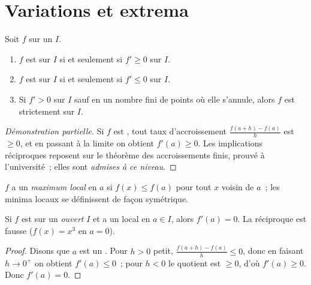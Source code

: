 \section{Variations et extrema}

\begin{theorem}\label{thm:g12:deriv:variations}
Soit $f$  sur un  $I$.
\begin{enumerate}
  \item $f$ est  sur $I$ si et seulement si $f' \geq 0$ sur $I$.
  \item $f$ est  sur $I$ si et seulement si $f' \leq 0$ sur $I$.
  \item Si $f' > 0$ sur $I$ sauf en un nombre fini de points où elle
        s'annule, alors $f$ est strictement  sur $I$.
\end{enumerate}
\end{theorem}

\begin{proof}[Démonstration partielle]
Si $f$ est , tout taux d'accroissement
$\frac{f(a+h)-f(a)}{h}$ est $\geq 0$, et en passant à la limite on obtient
$f'(a) \geq 0$. Les implications réciproques reposent sur le théorème des
accroissements finis, prouvé à l'université~; elles sont \emph{admises à ce
niveau}.
\end{proof}

\begin{definition}\label{def:g12:deriv:extremum}
$f$ a un \emph{maximum local} en $a$ si $f(x) \leq f(a)$ pour
tout $x$ voisin de $a$~; les minima locaux se définissent de façon
symétrique.
\end{definition}

\begin{proposition}\label{prop:g12:deriv:critical}
Si $f$ est  sur un  \emph{ouvert} $I$ et a un 
local en $a \in I$, alors $f'(a) = 0$. La réciproque est fausse
($f(x) = x^3$ en $a = 0$).
\end{proposition}

\begin{proof}
Disons que $a$ est un . Pour $h > 0$ petit,
$\frac{f(a+h)-f(a)}{h} \leq 0$, donc en faisant $h \to 0^+$ on obtient
$f'(a) \leq 0$~; pour $h < 0$ le quotient est $\geq 0$, d'où
$f'(a) \geq 0$. Donc $f'(a) = 0$.
\end{proof}

